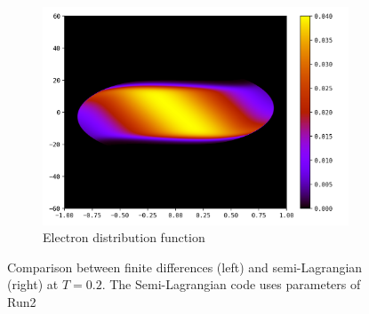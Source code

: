 \documentclass{article}
\numberwithin{equation}{section}
\newcommand{\imh}{\textheight} %
\newcommand{\imw}{\textwidth} %
\begin{document}
\begin{figure}
\begin{subfigure}{\textwidth}
		\includegraphics[height=\imh,width=\imw]{images/feT0p2.png}
		\caption{Electron distribution function}
		\label{subfig:compT02_electron}
	\end{subfigure}
	\caption{Comparison between finite differences (left) and semi-Lagrangian (right) at $T=0.2$. The Semi-Lagrangian code uses parameters of Run2}
	\label{fig:compT02}
\end{figure}  
\end{document}

